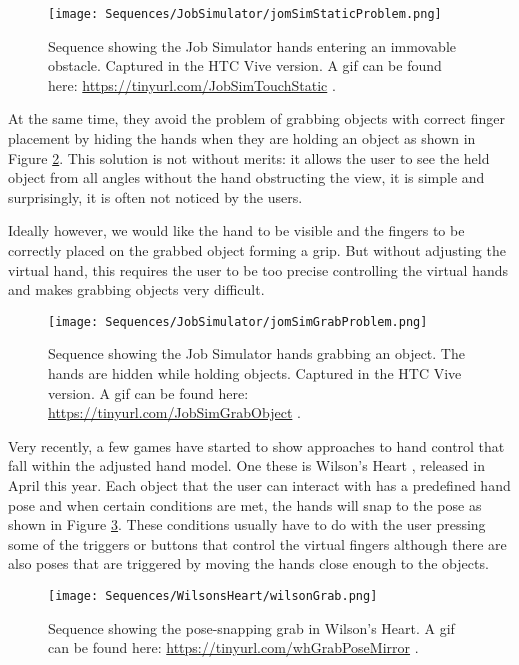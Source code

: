 \begin{figure}[H]
\centering
\texttt{[image: Sequences/JobSimulator/jomSimStaticProblem.png]}
\caption{Sequence showing the Job Simulator hands entering an immovable obstacle. Captured in the HTC Vive version. A gif can be found here: \url{https://tinyurl.com/JobSimTouchStatic} .}
\label{fig:jobSimStaticProblem}
\end{figure}

At the same time, they avoid the problem of grabbing objects with correct finger placement by hiding the hands when they are holding an object as shown in Figure \ref{fig:jobSimGrabProblem}. This solution is not without merits: it allows the user to see the held object from all angles without the hand obstructing the view, it is simple and surprisingly, it is often not noticed by the users.

Ideally however, we would like the hand to be visible and the fingers to be correctly placed on the grabbed object forming a grip. But without adjusting the virtual hand, this requires the user to be too precise controlling the virtual hands and makes grabbing objects very difficult.

\begin{figure}[H]
\centering
\texttt{[image: Sequences/JobSimulator/jomSimGrabProblem.png]}
\caption{Sequence showing the Job Simulator hands grabbing an object. The hands are hidden while holding objects. Captured in the HTC Vive version. A gif can be found here: \url{https://tinyurl.com/JobSimGrabObject} .}
\label{fig:jobSimGrabProblem}
\end{figure}

Very recently, a few games have started to show approaches to hand control that fall within the adjusted hand model. One these is Wilson's Heart \parencite{TwistedPixelGames2017}, released in April this year. Each object that the user can interact with has a predefined hand pose and when certain conditions are met, the hands will snap to the pose as shown in Figure \ref{fig:wilsonGrab}. These conditions usually have to do with the user pressing some of the triggers or buttons that control the virtual fingers although there are also poses that are triggered by moving the hands close enough to the objects.

\begin{figure}[H]
\centering
\texttt{[image: Sequences/WilsonsHeart/wilsonGrab.png]}
\caption{Sequence showing the pose-snapping grab in Wilson's Heart. A gif can be found here: \url{https://tinyurl.com/whGrabPoseMirror} .}
\label{fig:wilsonGrab}
\end{figure}

